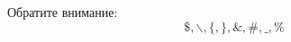 \documentclass[a4paper, 12pt]{article}
\begin{document}
    Обратите внимание:
    \[\$, \backslash, \{, \}, \&, \#, \_, \%\]
\end{document}
